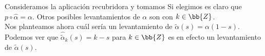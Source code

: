 \begin{ejemplo}
    Consideramos la aplicación recubridora
    y tomamos
    Si elegimos
    es claro que $p\circ \hat{\alpha} = \alpha$. Otros posibles levantamientos de $\alpha$ son 
    con $k\in \bb{Z}$.\\
    
    Nos planteamos ahora cuál sería un levantamiento de $\tilde{\alpha}(s) = \alpha(1-s)$. Podemos ver que $\hat{\tilde{\alpha}}_k(s) = k-s$ para $k\in \bb{Z}$ es en efecto un levantamiento de $\tilde{\alpha}(s)$.\\
\end{ejemplo}


